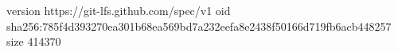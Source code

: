 version https://git-lfs.github.com/spec/v1
oid sha256:785f4d393270ea301b68ea569bd7a232eefa8e2438f50166d719fb6acb448257
size 414370
